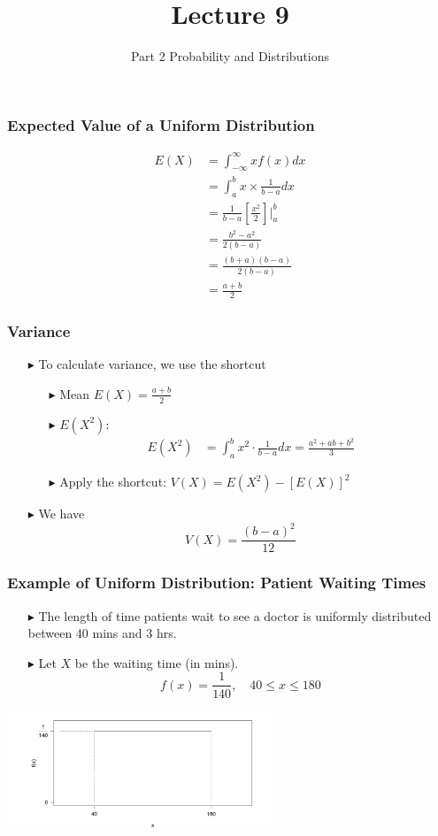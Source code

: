 \documentclass[12pt]{beamer}
\title[ECON2843]{Lecture 9}
\subtitle{Part 2 Probability and Distributions}
\date{}
\begin{document}
	\begin{frame}
		\titlepage
	\end{frame}
	\begin{frame}
		\frametitle{Expected Value of a Uniform Distribution}
		
		\begin{align*}
			E(X) &= \int_{-\infty}^{\infty} x f(x) dx \\
			&= \int_a^b x \times \frac{1}{b-a} dx \\
			&= \frac{1}{b-a} \left[\frac{x^2}{2}\right]|_a^b \\
			&= \frac{b^2 - a^2}{2(b-a)} \\
			&= \frac{(b+a)(b-a)}{2(b-a)} \\
			&= \frac{a+b}{2}
		\end{align*}
		
	\end{frame}
\begin{frame}
	\frametitle{Variance}
	
		\begin{itemize}
		\item[\color{blue}$\blacktriangleright$] To calculate variance, we use the shortcut
		\begin{itemize}
			\item[\color{blue}$\blacktriangleright$] Mean $E(X) = \frac{a+b}{2}$
			\item[\color{blue}$\blacktriangleright$] $E(X^2)$:
			\begin{align*}
				E(X^2) &= \int_a^b x^2 \cdot \frac{1}{b-a} dx = \frac{a^2 + ab + b^2}{3}
			\end{align*}
			\item[\color{blue}$\blacktriangleright$] Apply the shortcut: $V(X) = E(X^2) - [E(X)]^2$
		\end{itemize}
		
		\item[\color{blue}$\blacktriangleright$] We have
			\[
			V(X) = \frac{(b-a)^2}{12}
			\]
	\end{itemize}
	
\end{frame}
\begin{frame}
	\frametitle{Example of Uniform Distribution: Patient Waiting Times}
	\begin{itemize}
		\item[\color{blue}$\blacktriangleright$] The length of time patients wait to see a doctor is uniformly distributed between 40 mins and 3 hrs.
		\item[\color{blue}$\blacktriangleright$] Let $X$ be the waiting time (in mins).
		\[f(x) = \frac{1}{140},\quad 40\le x\le180\]
	\end{itemize}
	\centering
\includegraphics[width=8cm]{uniform.png}
\end{frame}
\end{document}
